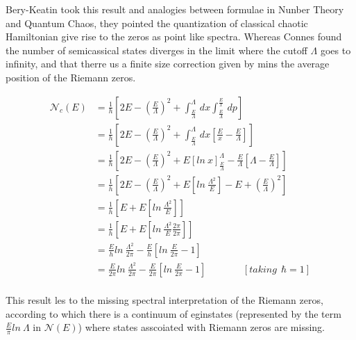 \documentclass[12pt]{report}
\newcommand*{\1}{\hspace{1pt}}
\begin{document}
    Bery-Keatin took this result and analogies between formulae in Nunber Theory and Quantum Chaos, they pointed the quantization of classical chaotic Hamiltonian give
    rise to the zeros as point like spectra.\cite{s1,s4} Whereas Connes found the number of semicassical states diverges in the limit where the cutoff $\Lambda$ goes to
    infinity, and that therre us a finite size correction given by mins the average position of the Riemann zeros.

    \begin{equation}
        \begin{split}
            \mathcal {N}_{c} (E) &= \frac{1}{h}\left[ 2E - \left(\frac{E}{\Lambda} \right)^{2} + \int_{\frac{E}{\Lambda}}^{\Lambda}  \,dx\int^{\frac{E}{x}}_{\frac{E}{\Lambda}}  \,dp   \right] \\ 
             & = \frac{1}{h}\left[ 2E - \left(\frac{E}{\Lambda} \right)^{2} + \int_{\frac{E}{\Lambda}}^{\Lambda}  \,dx\left[\frac{E}{x} - \frac{E}{\Lambda}\right]   \right] \\ 
             & = \frac{1}{h}\left[ 2E - \left(\frac{E}{\Lambda} \right)^{2} + E\left[ln \ x\right] _{\frac{E}{\Lambda}}^{\Lambda} - \frac{E}{\Lambda}\left[\Lambda - \frac{E}{\Lambda}\right]   \right] \\ 
             & = \frac{1}{h}\left[ 2E - \left(\frac{E}{\Lambda} \right)^{2} + E\left[ln \ \frac{\Lambda ^{2}}{E}\right] - E + \left(\frac{E}{\Lambda}\right)^{2}\right]  \\ 
             & = \frac{1}{h}\left[ E  + E\left[ln \ \frac{\Lambda ^{2}}{E}\right] \right]  \\ 
             & = \frac{1}{h}\left[ E  + E\left[ln \ \frac{\Lambda ^{2}}{E}\frac{2\pi}{2\pi}\right] \right]  \\ 
             & = \frac{E}{h} ln \ \frac{\Lambda ^{2}}{2\pi} - \frac{E}{h} \left[ln \ \frac{E}{2\pi} - 1\right]  \\
             & = \frac{E}{2\pi} ln \ \frac{\Lambda ^{2}}{2\pi} - \frac{E}{2\pi} \left[ln \ \frac{E}{2\pi} - 1\right] \ \ \ \ \ \ \ \ \ \ \ \ \ \ \ \ \   [taking \ \ \hbar=1] \\
        \end{split} 
    \end{equation}

    This result les to the missing spectral interpretation of the Riemann zeros, according to which there is a continuum of eginstates (represented by the term $\frac{E}{\pi}
     ln \ \Lambda$ in $\mathcal {N} (E)$) where states asscoiated with Riemann zeros are missing.
\end{document}
